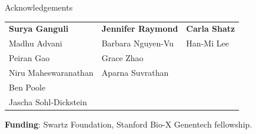 \documentclass{beamer}%
\begin{document}
%
%
%
%
%
%
%
%
%
%

\begin{frame}{Acknowledgements}
%
 \begin{tabular}{lll}
   \textbf{Surya Ganguli} & \textbf{Jennifer Raymond} & \textbf{Carla Shatz} \\
   Madhu Advani & Barbara Nguyen-Vu & Han-Mi Lee \\
   Peiran Gao & Grace Zhao & \\
   Niru Maheswaranathan & Aparna Suvrathan \\
   Ben Poole \\
   Jascha Sohl-Dickstein
 \end{tabular}

 \vp\textbf{Funding}: Swartz Foundation, Stanford Bio-X Genentech fellowship.
%
\end{frame}
\end{document}

